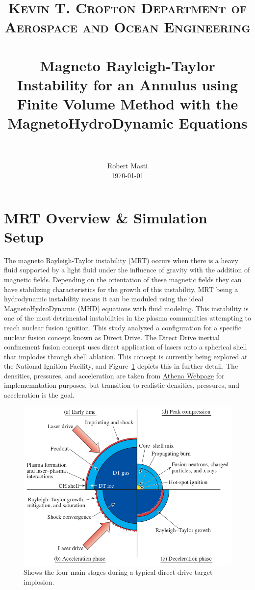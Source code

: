 \documentclass[paper=a4, fontsize=11pt]{scrartcl}
\title{%
    \usefont{OT1}{bch}{b}{n}
    \normalfont\normalsize \textsc{Kevin T. Crofton Department of Aerospace and Ocean Engineering} \\ [25pt]
    \horrule{0.5pt} \\[0.4cm]
    \huge Magneto Rayleigh-Taylor Instability for an Annulus using Finite Volume Method with the MagnetoHydroDynamic Equations  \\
    \horrule{2pt} \\[0.5cm]}
\author{\normalfont\normalsize
  Robert Masti\\[-3pt]  
  \normalsize\today}
\date{}
\numberwithin{equation}{section}                %
\numberwithin{figure}{section}                  %
\numberwithin{table}{section}                           %
\begin{document}
\maketitle
\section{MRT Overview \& Simulation Setup}\label{sec:ovrvw}
The magneto Rayleigh-Taylor instability (MRT) occurs when there is a heavy fluid supported by a light fluid under the influence of gravity with the addition of magnetic fields. Depending on the orientation of these magnetic fields they can have stabilizing characteristics for the growth of this instability. MRT being a hydrodynamic instability means it can be moduled using the ideal MagnetoHydroDynamic (MHD) equations with fluid modeling. This instability is one of the most detrimental instabilities in the plasma communities attempting to reach nuclear fusion ignition. This study analyzed a configuration for a specific nuclear fusion concept known as Direct Drive. The Direct Drive inertial confinement fusion concept uses direct application of lasers onto a spherical shell that implodes through shell ablation. This concept is currently being explored at the National Ignition Facility, and Figure~\ref{fig:ovrvw:dd} depicts this in further detail. The densities, pressures, and acceleration are taken from \href{https://www.astro.princeton.edu/~jstone/Athena/tests/rt/rt.html}{Athena Webpage} for implememntation purposes, but transition to realistic densities, pressures, and acceleration is the goal.


  \begin{figure}[!htb]
    \centering
    \includegraphics[width=0.9\linewidth]{fig/DDfusion}
    \caption{Shows the four main stages during a typical direct-drive target implosion.\cite{craxton2015}}\label{fig:ovrvw:dd}
  \end{figure}
\end{document}

